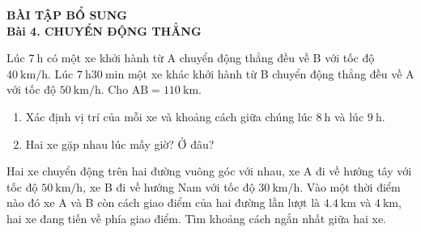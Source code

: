 \begin{center}\textbf{\color{red}BÀI TẬP BỔ SUNG}\\
	\textbf{Bài 4. CHUYỂN ĐỘNG THẲNG}
\end{center}
\begin{ex}
	Lúc $\SI{7}{\hour}$ có một xe khởi hành từ A chuyển động thẳng đều về B với tốc độ $\SI{40}{\kilo\meter/\hour}$. Lúc $\SI{7}{\hour}\SI{30}{\minute}$ một xe khác khởi hành từ B chuyển động thẳng đều về A  với tốc độ $\SI{50}{\kilo\meter/\hour}$. Cho $\mathrm{AB}=\SI{110}{\kilo\meter}$.
	\begin{enumerate}[label=\alph*)]
		\item Xác định vị trí của mỗi xe và khoảng cách giữa chúng lúc $\SI{8}{\hour}$ và lúc $\SI{9}{\hour}$.
		\item Hai xe gặp nhau lúc mấy giờ? Ở đâu?
	\end{enumerate}
\end{ex}
\begin{ex}
	Hai xe chuyển động trên hai đường vuông góc với nhau, xe A đi về hướng tây với tốc độ $\SI{50}{\kilo\meter/\hour}$, xe B đi về hướng Nam với tốc độ $\SI{30}{\kilo\meter/\hour}$. Vào một thời điểm nào đó xe A và B còn cách giao điểm của hai đường lần lượt là $\SI{4.4}{\kilo\meter}$ và $\SI{4}{\kilo\meter}$, hai xe đang tiến về phía giao điểm. Tìm khoảng cách ngắn nhất giữa hai xe.
\end{ex}